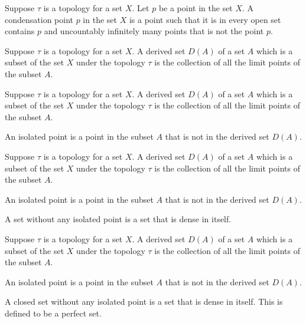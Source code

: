 \begin{definition}
	\label{definition-condensation-point}
	Suppose $\tau$ is a topology for a set $X$.
	Let $p$ be a point in the set $X$.
	A condensation point $p$ in the set $X$ is a point such that it is in every open set contains $p$ and uncountably infinitely many points that is not the point $p$.
\end{definition}

\begin{definition}
	\label{definition-derived-set}
	Suppose $\tau$ is a topology for a set $X$.
	A derived set $D(A)$ of a set $A$ which is a subset of the set $X$ under the topology $\tau$ is the collection of all the limit points of the subset $A$.
\end{definition}

\begin{definition}
	\label{definition-isolated-point}
	Suppose $\tau$ is a topology for a set $X$.
	A derived set $D(A)$ of a set $A$ which is a subset of the set $X$ under the topology $\tau$ is the collection of all the limit points of the subset $A$.

	An isolated point is a point in the subset $A$ that is not in the derived set $D(A)$.
\end{definition}

\begin{definition}
	\label{definition-dense-in-itself}
	Suppose $\tau$ is a topology for a set $X$.
	A derived set $D(A)$ of a set $A$ which is a subset of the set $X$ under the topology $\tau$ is the collection of all the limit points of the subset $A$.

	An isolated point is a point in the subset $A$ that is not in the derived set $D(A)$.

	A set without any isolated point is a set that is dense in itself.
\end{definition}

\begin{definition}
	\label{definition-perfect}
	Suppose $\tau$ is a topology for a set $X$.
	A derived set $D(A)$ of a set $A$ which is a subset of the set $X$ under the topology $\tau$ is the collection of all the limit points of the subset $A$.

	An isolated point is a point in the subset $A$ that is not in the derived set $D(A)$.

	A closed set without any isolated point is a set that is dense in itself. This is defined to be a perfect set.
\end{definition}

